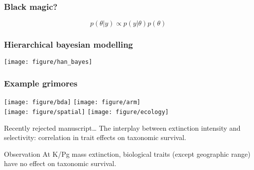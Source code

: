 \documentclass{beamer}
\begin{document}
\begin{frame}
  \frametitle{Black magic?}
  \begin{LARGE}
    \begin{equation*}
      p(\theta | y) \propto p(y | \theta) p(\theta) 
    \end{equation*}
  \end{LARGE}
\end{frame}

\begin{frame}
  \frametitle{Hierarchical bayesian modelling}
  \begin{center}
    \texttt{[image: figure/han\_bayes]}
  \end{center}
\end{frame}

\begin{frame}
  \frametitle{Example grimores}
  \begin{center}
    \noindent
    \texttt{[image: figure/bda]}\hspace{0.2\textwidth}%
    \texttt{[image: figure/arm]}\\[2em]
    \texttt{[image: figure/spatial]}\hspace{0.2\textwidth}%
    \texttt{[image: figure/ecology]}\par
  \end{center}
\end{frame}


\begin{frame}
  \begin{block}{Recently rejected manuscript\dots}
    The interplay between extinction intensity and selectivity: correlation in trait effects on taxonomic survival.
  \end{block}
\end{frame}

\begin{frame}
  \begin{alertblock}{Observation}
    At K/Pg mass extinction, biological traits (except geographic range) have no effect on taxonomic survival.

  \end{alertblock}
\end{frame}
\end{document}
